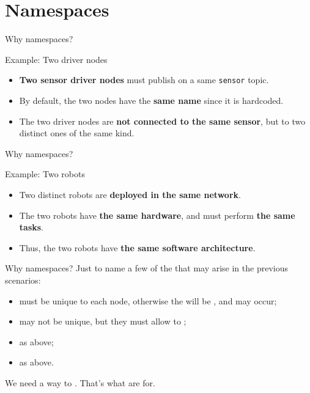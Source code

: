 
\section{Namespaces}

\begin{frame}{Why namespaces?}
  \begin{exampleblock}{Example: Two driver nodes}
    \begin{itemize}
      \item \textbf{Two sensor driver nodes} must publish on a same \texttt{sensor} topic.
      \item By default, the two nodes have the \textbf{same name} since it is hardcoded.
      \item The two driver nodes are \textbf{not connected to the same sensor}, but to two distinct ones of the same kind.
    \end{itemize}
  \end{exampleblock}
\end{frame}
\begin{frame}{Why namespaces?}
  \begin{exampleblock}{Example: Two robots}
    \begin{itemize}
      \item Two distinct robots are \textbf{deployed in the same network}.
      \item The two robots have \textbf{the same hardware}, and must perform \textbf{the same tasks}.
      \item Thus, the two robots have \textbf{the same software architecture}.
    \end{itemize}
  \end{exampleblock}
\end{frame}
\begin{frame}{Why namespaces?}
  Just to name a few of the  that may arise in the previous scenarios:
  \begin{itemize}
    \item {} must be unique to each node, otherwise the  will be , and  may occur;
    \item {} may not be unique, but they must allow to ;
    \item {} as above;
    \item {} as above.
  \end{itemize}
  \vspace{10pt}
  We need a way to . That's what  are for.
\end{frame}

